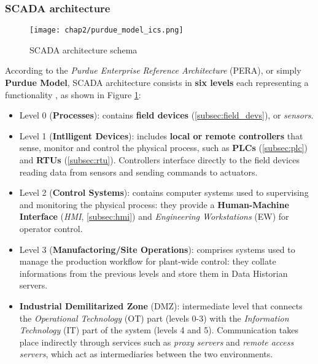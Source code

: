 \subsubsection{SCADA architecture}
\begin{figure}[ht]
	\centering
	\texttt{[image: chap2/purdue\_model\_ics.png]}
	\caption{SCADA architecture schema}
	\label{fig:SCADA_schema}
\end{figure}

According to the \textit{Purdue Enterprise Reference Architecture} (PERA), or simply \textbf{Purdue Model}, SCADA architecture consists in \textbf{six levels} each representing a functionality \cite{purdue_model}, as shown in Figure \ref{fig:SCADA_schema}:

\begin{itemize}
	\item Level 0 (\textbf{Processes}): contains \textbf{field devices} (\ref{subsec:field_devs}), or \textit{sensors}.
	
	\item Level 1 (\textbf{Intlligent Devices}): includes \textbf{local or remote controllers} that sense, monitor and control the physical process, such as \textbf{PLCs} (\ref{subsec:plc}) and \textbf{RTUs} (\ref{subsec:rtu}). Controllers interface directly to the field devices reading data from sensors and sending commands to actuators.
	
	\item Level 2 (\textbf{Control Systems}): contains computer systems used to supervising and monitoring the physical process: they provide a \textbf{Human-Machine Interface} (\textit{HMI}, \ref{subsec:hmi}) and \textit{Engineering Workstations} (EW) for operator control.
	
	\item Level 3 (\textbf{Manufactoring/Site Operations}): comprises systems used to manage the production workflow for plant-wide control: they collate informations from the previous levels and store them in Data Historian servers.
	
	\item \textbf{Industrial Demilitarized Zone} (DMZ): intermediate level that connects the \textit{Operational Technology} (OT) part (levels 0-3) with the \textit{Information Technology} (IT) part of the system (levels 4 and 5). Communication takes place indirectly through services such as \textit{proxy servers} and \textit{remote access servers}, which act as intermediaries between the two environments.
	

\end{itemize}
